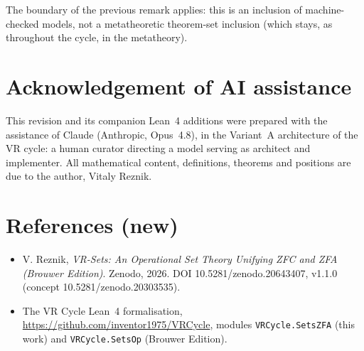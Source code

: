 \documentclass[11pt]{article}
\theoremstyle{remark}
\begin{document}
\noindent The boundary of the previous remark applies: this is an inclusion of machine-checked models,
not a metatheoretic theorem-set inclusion (which stays, as throughout the cycle, in the metatheory).

\section*{Acknowledgement of AI assistance}
This revision and its companion Lean~4 additions were prepared with the assistance of Claude
(Anthropic, Opus~4.8), in the Variant~A architecture of the VR cycle: a human curator directing a
model serving as architect and implementer. All mathematical content, definitions, theorems and
positions are due to the author, Vitaly Reznik.

\section*{References (new)}
\begin{itemize}
\item V. Reznik, \emph{VR-Sets: An Operational Set Theory Unifying ZFC and ZFA (Brouwer Edition)}.
Zenodo, 2026. DOI 10.5281/zenodo.20643407, v1.1.0 (concept 10.5281/zenodo.20303535).
\item The VR Cycle Lean~4 formalisation, \url{https://github.com/inventor1975/VRCycle}, modules
\texttt{VRCycle.SetsZFA} (this work) and \texttt{VRCycle.SetsOp} (Brouwer Edition).
\end{itemize}
\end{document}
